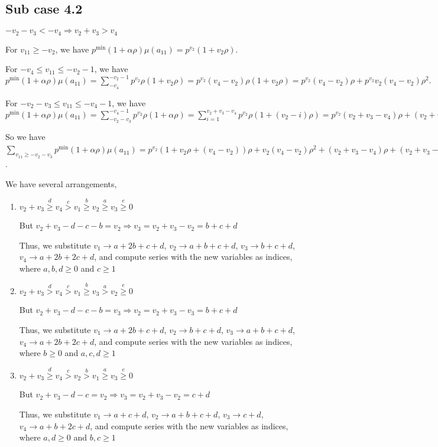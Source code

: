 \documentclass{article}
\begin{document}
\subsection{Sub case 4.2}
$-v_2-v_3<{-v_4}\Rightarrow{v_2+v_3>{v_4}}$

For $v_{11}\geq{-v_2}$, we have $p^{\min}(1+\alpha\rho)\mu(a_{11})=p^{v_2}(1+v_2\rho).$

For $-v_4\leq{v_{11}}\leq{-v_2-1}$, we have $p^{\min}(1+\alpha\rho)\mu(a_{11})=\sum_{-v_4}^{-v_2-1}p^{v_2}\rho(1+v_2\rho)=p^{v_2}(v_4-v_2)\rho(1+v_2\rho)=p^{v_2}(v_4-v_2)\rho+p^{v_2}v_2(v_4-v_2)\rho^2.$

For $-v_2-v_3\leq{v_{11}}\leq{-v_4-1}$, we have $p^{\min}(1+\alpha\rho)\mu(a_{11})=\sum_{-v_2-v_3}^{-v_4-1}p^{v_2}\rho(1+\alpha\rho)=\sum_{i=1}^{v_2+v_3-v_4}p^{v_2}\rho(1+(v_2-i)\rho)=p^{v_2}(v_2+v_3-v_4)\rho+(v_2+v_3-v_4)v_2\rho^2-\binom{v_2+v_3-v_4+1}{2}\rho^2.$

So we have $\sum_{v_{11}\geq{-v_2-v_3}}p^{\min}(1+\alpha\rho)\mu(a_{11})=p^{v_2}(1+v_2\rho+(v_4-v_2))\rho+v_2(v_4-v_2)\rho^2+(v_2+v_3-v_4)\rho+(v_2+v_3-v_4)v_2\rho^2-\frac{(v_2+v_3-v_4+1)(v_2+v_3-v_4)}{2}\rho^2)=p^{v_2}(1+v_2v_4\rho^2+v_2\rho+v_3\rho+v_3v_2\rho^2-v_4v_2\rho^2-\frac{v_2^2}{2}\rho^2-v_2v_3\rho^2+v_2v_4\rho^2-\frac{v_3^2}{2}\rho^2+v_3v_4\rho^2-\frac{v_4^2}{2}\rho^2-\frac{v_2}{2}\rho^2-\frac{v_3}{2}\rho^2+\frac{v_4}{2}\rho^2)$.

We have several arrangements,
\begin{enumerate}
\item 
$v_2+v_3\overset{d}{\geq}v_4\overset{c}{>}v_1\overset{b}{\geq}{v_2}\overset{a}{\geq}v_3\overset{e}{\geq}{0}$

But $v_2+v_3-d-c-b=v_2\Rightarrow{v_3=v_2+v_3-v_2=b+c+d}$

Thus, we substitute 
$v_1\rightarrow{a+2b+c+d}$, 
$v_2\rightarrow{a+b+c+d}$, 
$v_3\rightarrow{b+c+d}$, 
$v_4\rightarrow{a+2b+2c+d}$, and compute series with the new variables as indices, where $a,b,d\geq{0}$ and $c\geq{1}$

\item 
$v_2+v_3\overset{d}{>}v_4\overset{c}{>}v_1\overset{b}{\geq}{v_3}\overset{a}{>}v_2\overset{e}{\geq}{0}$

But $v_2+v_3-d-c-b=v_3\Rightarrow{v_2=v_2+v_3-v_3=b+c+d}$

Thus, we substitute 
$v_1\rightarrow{a+2b+c+d}$, 
$v_2\rightarrow{b+c+d}$, 
$v_3\rightarrow{a+b+c+d}$, 
$v_4\rightarrow{a+2b+2c+d}$, and compute series with the new variables as indices, where $b\geq{0}$ and $a,c,d\geq{1}$
\item 
$v_2+v_3\overset{d}{\geq}v_4\overset{c}{>}v_2\overset{b}{>}{v_1}\overset{a}{\geq}v_3\overset{e}{\geq}{0}$

But $v_2+v_3-d-c=v_2\Rightarrow{v_3=v_2+v_3-v_2=c+d}$

Thus, we substitute 
$v_1\rightarrow{a+c+d}$, 
$v_2\rightarrow{a+b+c+d}$, 
$v_3\rightarrow{c+d}$, 
$v_4\rightarrow{a+b+2c+d}$, and compute series with the new variables as indices, where $a,d\geq{0}$ and $b,c\geq{1}$

\end{enumerate}
\end{document}
